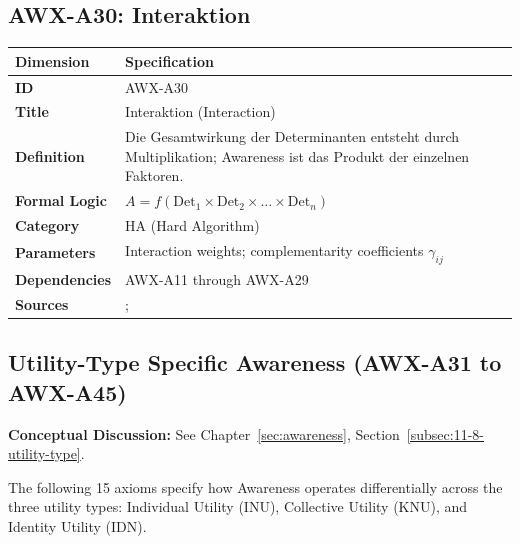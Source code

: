 
\subsection{AWX-A30: Interaktion}

\begin{table}[htbp]
\small
\begin{tabular}{p{3cm}p{11cm}}
\toprule
\textbf{Dimension} & \textbf{Specification} \\
\midrule
\textbf{ID} & AWX-A30 \\
\textbf{Title} & Interaktion (Interaction) \\
\textbf{Definition} & Die Gesamtwirkung der Determinanten entsteht durch Multiplikation; Awareness ist das Produkt der einzelnen Faktoren. \\
\textbf{Formal Logic} & $A = f(\text{Det}_1 \times \text{Det}_2 \times \ldots \times \text{Det}_n)$ \\
\textbf{Category} & HA (Hard Algorithm) \\
\textbf{Parameters} & Interaction weights; complementarity coefficients $\gamma_{ij}$ \\
\textbf{Dependencies} & AWX-A11 through AWX-A29 \\
\textbf{Sources} & \citet{milgrom1990rationalizability}; \citet{milgrom1995complementarities} \\
\bottomrule
\end{tabular}
\end{table}




\subsection{Utility-Type Specific Awareness (AWX-A31 to AWX-A45)}

\begin{cross-reference}
\textbf{Conceptual Discussion:} See Chapter~\ref{sec:awareness}, Section~\ref{subsec:11-8-utility-type}.
\end{cross-reference}
The following 15 axioms specify how Awareness operates differentially across the three utility types: Individual Utility (INU), Collective Utility (KNU), and Identity Utility (IDN).


